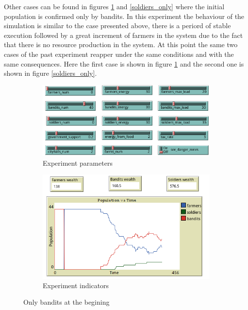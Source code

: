 \documentclass{wscpaperproc}
\begin{document}
Other cases can be found in figures \ref{bandits_only} and \ref{soldiers_only}
where the initial population is confirmed only by bandits. In this experiment
the behaviour of the simulation is similar to the case presented above, there
is a periord of stable execution followed by a great increment of farmers in
the system due to the fact that there is no resource production in the system.
At this point the same two cases of the past experiment reapper under the same
conditions and with the same consequences. Here the first case is shown in
figure \ref{bandits_only} and the second one is shown in figure
\ref{soldiers_only}.\\

\begin{figure}[h!]
    \begin{subfigure}{0.35\textwidth}
    \includegraphics[width=\textwidth]{Images/Exp3_sliders.png}
    \caption{Experiment parameters}
    \end{subfigure}
    \hfill
    \begin{subfigure}{0.35\textwidth}
    \includegraphics[width=\textwidth]{Images/Exp3_indicators.png}
    \caption{Experiment indicators}
    \end{subfigure}%
    \caption{Only bandits at the begining}
    \label{bandits_only}
\end{figure}
\end{document}
